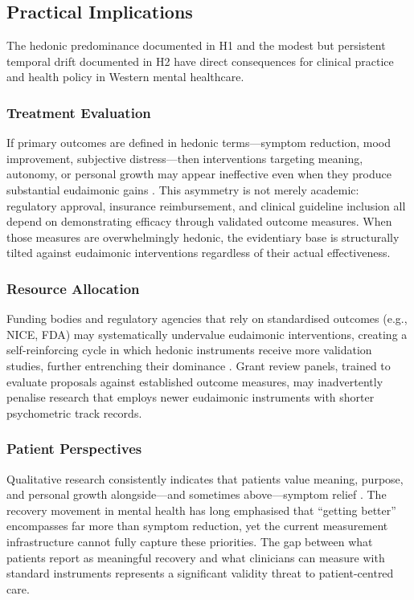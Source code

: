 \documentclass[12pt,a4paper]{article}
\begin{document}
\subsection{Practical Implications}

The hedonic predominance documented in H1 and the modest but persistent temporal drift documented in H2 have direct consequences for clinical practice and health policy in Western mental healthcare.

\subsubsection{Treatment Evaluation}

If primary outcomes are defined in hedonic terms---symptom reduction, mood improvement, subjective distress---then interventions targeting meaning, autonomy, or personal growth may appear ineffective even when they produce substantial eudaimonic gains \citep{seligman2005positive, sin2009enhancing, wong2011what}.
This asymmetry is not merely academic: regulatory approval, insurance reimbursement, and clinical guideline inclusion all depend on demonstrating efficacy through validated outcome measures.
When those measures are overwhelmingly hedonic, the evidentiary base is structurally tilted against eudaimonic interventions regardless of their actual effectiveness.

\subsubsection{Resource Allocation}

Funding bodies and regulatory agencies that rely on standardised outcomes (e.g., NICE, FDA) may systematically undervalue eudaimonic interventions, creating a self-reinforcing cycle in which hedonic instruments receive more validation studies, further entrenching their dominance \citep{vittersø2016handbook}.
Grant review panels, trained to evaluate proposals against established outcome measures, may inadvertently penalise research that employs newer eudaimonic instruments with shorter psychometric track records.

\subsubsection{Patient Perspectives}

Qualitative research consistently indicates that patients value meaning, purpose, and personal growth alongside---and sometimes above---symptom relief \citep{slade2010mental, davidson2008recovery}.
The recovery movement in mental health has long emphasised that ``getting better'' encompasses far more than symptom reduction, yet the current measurement infrastructure cannot fully capture these priorities.
The gap between what patients report as meaningful recovery and what clinicians can measure with standard instruments represents a significant validity threat to patient-centred care.
\end{document}
